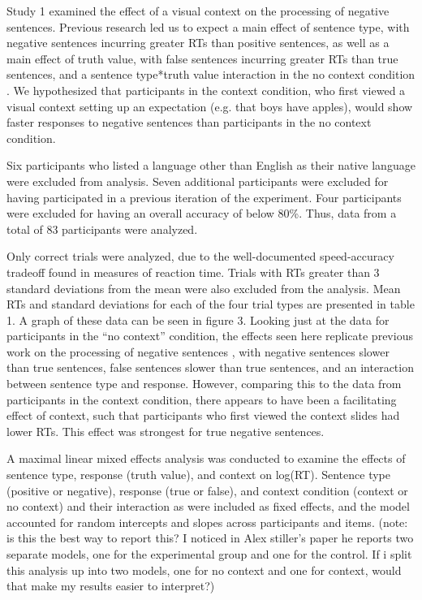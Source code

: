 \documentclass[man]{apa2}
\begin{document}
Study 1 examined the effect of a visual context on the processing of negative sentences.  Previous research led us to expect a main effect of sentence type, with negative sentences incurring greater RTs than positive sentences, as well as a main effect of truth value, with false sentences incurring greater RTs than true sentences, and a sentence type*truth value interaction in the no context condition \cite{hclark1972}.  We hypothesized that participants in the context condition, who first viewed a visual context setting up an expectation (e.g. that boys have apples), would show faster responses to negative sentences than participants in the no context condition.  

Six participants who listed a language other than English as their native language were excluded from analysis.  Seven additional participants were excluded for having participated in a previous iteration of the experiment.  Four participants were excluded for having an overall accuracy of below 80\%.  Thus, data from a total of 83 participants were analyzed.  

Only correct trials were analyzed, due to the well-documented speed-accuracy tradeoff found in measures of reaction time.  Trials with RTs greater than 3 standard deviations from the mean were also excluded from the analysis.  Mean RTs and standard deviations for each of the four trial types are presented in table 1.  A graph of these data can be seen in figure 3.  Looking just at the data for participants in the ``no context'' condition, the effects seen here replicate previous work on the processing of negative sentences \cite{hclark1972, carpenter1975, just1971, just1976}, with negative sentences slower than true sentences, false sentences slower than true sentences, and an interaction between sentence type and response.  However, comparing this to the data from participants in the context condition, there appears to have been a facilitating effect of context, such that participants who first viewed the context slides had lower RTs.  This effect was strongest for true negative sentences.  

A maximal linear mixed effects analysis was conducted to examine the effects of sentence type, response (truth value), and context on log(RT).  Sentence type (positive or negative), response (true or false), and context condition (context or no context) and their interaction as were included as fixed effects, and the model accounted for random intercepts and slopes across participants and items.  (note: is this the best way to report this?  I noticed in Alex stiller's paper he reports two separate models, one for the experimental group and one for the control.  If i split this analysis up into two models, one for no context and one for context, would that make my results easier to interpret?)
\end{document}
